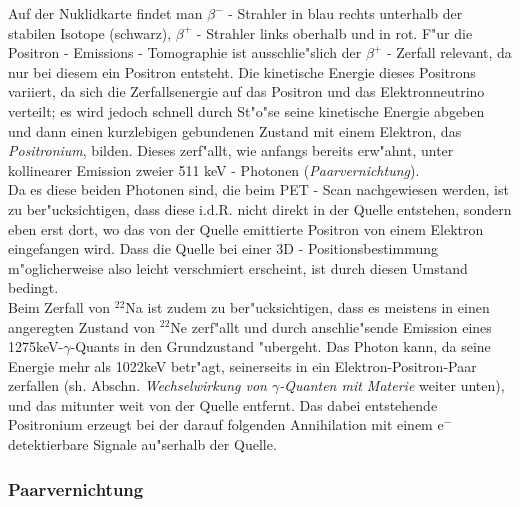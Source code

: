 \documentclass{article}
\begin{document}
Auf der Nuklidkarte findet man $\beta^-$ - Strahler in blau rechts unterhalb der stabilen Isotope  (schwarz), $\beta^+$ - Strahler links oberhalb und in rot.
F"ur die Positron - Emissions - Tomographie ist ausschlie"slich der $\beta^+$ - Zerfall relevant, da nur bei diesem ein Positron entsteht. Die kinetische Energie dieses Positrons variiert, da sich die Zerfallsenergie auf das Positron und das Elektronneutrino verteilt; es wird jedoch schnell durch St"o"se seine kinetische Energie abgeben und dann einen kurzlebigen gebundenen Zustand mit einem Elektron, das \textit{Positronium}, bilden. Dieses zerf"allt, wie anfangs bereits erw"ahnt, unter kollinearer Emission zweier 511 keV - Photonen (\textit{Paarvernichtung}).\\
Da es diese beiden Photonen sind, die beim PET - Scan nachgewiesen werden, ist zu ber"ucksichtigen, dass diese i.d.R. nicht direkt in der Quelle entstehen, sondern eben erst dort, wo das von der Quelle emittierte Positron von einem Elektron eingefangen wird. Dass die Quelle bei einer 3D - Positionsbestimmung m"oglicherweise also leicht verschmiert erscheint, ist durch diesen Umstand bedingt.\\
Beim Zerfall von $^{22}$Na ist zudem zu ber"ucksichtigen, dass es meistens in einen angeregten Zustand von $^{22}$Ne zerf"allt und durch anschlie"sende Emission eines 1275keV-$\gamma$-Quants in den Grundzustand "ubergeht. Das Photon kann, da seine Energie mehr als 1022keV betr"agt, seinerseits in ein Elektron-Positron-Paar zerfallen (sh. Abschn. \textit{Wechselwirkung von $\gamma$-Quanten mit Materie} weiter unten), und das mitunter weit von der Quelle entfernt. Das dabei entstehende Positronium erzeugt bei der darauf folgenden Annihilation mit einem e$^-$ detektierbare Signale au"serhalb der Quelle.




\subsubsection{Paarvernichtung}
\end{document}
